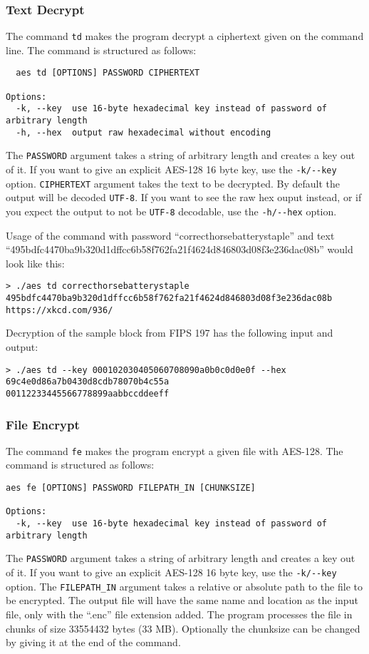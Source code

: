 \subsubsection{Text Decrypt}
The command \lstinline{td} makes the program decrypt a ciphertext given on the command line. The command is structured as follows:
\begin{lstlisting}
  aes td [OPTIONS] PASSWORD CIPHERTEXT

Options:
  -k, --key  use 16-byte hexadecimal key instead of password of arbitrary length
  -h, --hex  output raw hexadecimal without encoding
\end{lstlisting}
The \lstinline{PASSWORD} argument takes a string of arbitrary length and creates a key out of it. If you want to give an explicit AES-128 16 byte key, use the \lstinline{-k/--key} option. \lstinline{CIPHERTEXT} argument takes the text to be decrypted. By default the output will be decoded \lstinline{UTF-8}. If you want to see the raw hex ouput instead, or if you expect the output to not be \lstinline{UTF-8} decodable, use the \lstinline{-h/--hex} option.

Usage of the command with password \enquote{correcthorsebatterystaple} and text \enquote{495bdfc4470ba9b320d1dffcc6b58f762fa21f4624d846803d08f3e236dac08b} would look like this:
\begin{lstlisting}
> ./aes td correcthorsebatterystaple 495bdfc4470ba9b320d1dffcc6b58f762fa21f4624d846803d08f3e236dac08b
https://xkcd.com/936/
\end{lstlisting}

Decryption of the sample block from FIPS 197 \cite{aes2001} has the following input and output:
\begin{lstlisting}
> ./aes td --key 000102030405060708090a0b0c0d0e0f --hex 69c4e0d86a7b0430d8cdb78070b4c55a
00112233445566778899aabbccddeeff
\end{lstlisting}


\subsubsection{File Encrypt}
The command \lstinline{fe} makes the program encrypt a given file with AES-128. The command is structured as follows:
\begin{lstlisting}
aes fe [OPTIONS] PASSWORD FILEPATH_IN [CHUNKSIZE]

Options:
  -k, --key  use 16-byte hexadecimal key instead of password of arbitrary length
\end{lstlisting}
The \lstinline{PASSWORD} argument takes a string of arbitrary length and creates a key out of it. If you want to give an explicit AES-128 16 byte key, use the \lstinline{-k/--key} option. The \lstinline{FILEPATH_IN} argument takes a relative or absolute path to the file to be encrypted. The output file will have the same name and location as the input file, only with the \enquote{.enc} file extension added. The program processes the file in chunks of size 33554432 bytes (33 MB). Optionally the chunksize can be changed by giving it at the end of the command.

